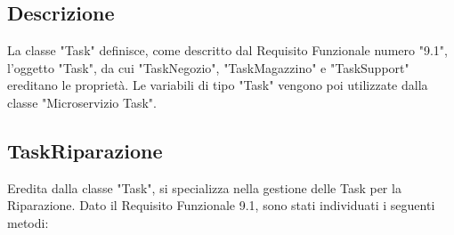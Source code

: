 \documentclass{report}
\begin{document}
\subsection*{Descrizione}
La classe "Task" definisce, come descritto dal Requisito Funzionale numero "9.1", l'oggetto "Task", da cui "TaskNegozio", "TaskMagazzino" e "TaskSupport" ereditano le proprietà. Le variabili di tipo "Task" vengono poi utilizzate dalla classe "Microservizio Task".

\subsection*{TaskRiparazione}
Eredita dalla classe "Task", si specializza nella gestione delle Task per la Riparazione. Dato il Requisito Funzionale 9.1, sono stati individuati i seguenti metodi:
\end{document}
